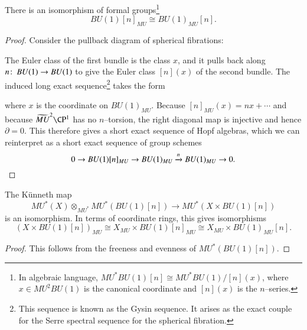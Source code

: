 \begin{lemma}\label{MUConvertsTorsionPointsToTorsionPoints}
There is an isomorphism of formal groups\footnote{In algebraic language, $MU^* BU(1)[n] \cong MU^* BU(1) / [n](x)$, where $x \in MU^2 BU(1)$ is the canonical coordinate and $[n](x)$ is the $n$--series.} \[BU(1)[n]_{MU} \cong BU(1)_{MU}[n].\]
\end{lemma}
\begin{proof}
Consider the pullback diagram of spherical fibrations:
\begin{center}
\end{center}
The Euler class of the first bundle is the class $x$, and it pulls back along $n\colon\thinspace BU(1) \to BU(1)$ to give the Euler class $[n](x)$ of the second bundle.  The induced long exact sequence\footnote{This sequence is known as the Gysin sequence.  It arises as the exact couple for the Serre spectral sequence for the spherical fibration.} takes the form
\begin{center}
\end{center}
where $x$ is the coordinate on $BU(1)_{MU}$.  Because $[n]_{MU}(x) = nx + \cdots$ and because $\widetilde{MU}^2 \CP^1$ has no $n$--torsion, the right diagonal map is injective and hence $\partial = 0$.  This therefore gives a short exact sequence of Hopf algebras, which we can reinterpret as a short exact sequence of group schemes \[0 \to BU(1)[n]_{MU} \to BU(1)_{MU} \xrightarrow{n} BU(1)_{MU} \to 0. \qedhere\]
\end{proof}

\begin{corollary}
The K\"unneth map \[MU^*(X) \otimes_{MU^*} MU^*(BU(1)[n]) \to MU^*(X \times BU(1)[n])\] is an isomorphism.  In terms of coordinate rings, this gives isomorphisms \[(X \times BU(1)[n])_{MU} \cong X_{MU} \times BU(1)[n]_{MU} \cong X_{MU} \times BU(1)_{MU}[n].\]
\end{corollary}
\begin{proof}
This follows from the freeness and evenness of $MU^*(BU(1)[n])$.
\end{proof}

